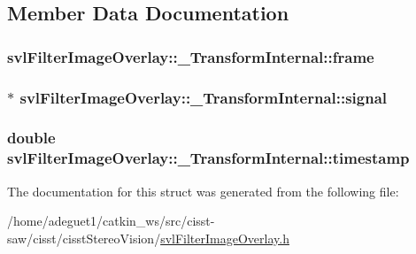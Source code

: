 \subsection{Member Data Documentation}
\hypertarget{structsvl_filter_image_overlay_1_1___transform_internal_a787852544228904e7cd3dfe152e0c8b5}{
\subsubsection[{frame}]{ svl\-Filter\-Image\-Overlay\-::\-\_\-\-Transform\-Internal\-::frame}}\label{structsvl_filter_image_overlay_1_1___transform_internal_a787852544228904e7cd3dfe152e0c8b5}
\hypertarget{structsvl_filter_image_overlay_1_1___transform_internal_a572ad98ec052cca3dc92321d7669c4e6}{
\subsubsection[{signal}]{$\ast$ svl\-Filter\-Image\-Overlay\-::\-\_\-\-Transform\-Internal\-::signal}}\label{structsvl_filter_image_overlay_1_1___transform_internal_a572ad98ec052cca3dc92321d7669c4e6}
\hypertarget{structsvl_filter_image_overlay_1_1___transform_internal_ae2a07acc677c86f82241a0c8594818c4}{
\subsubsection[{timestamp}]{\setlength{\rightskip}{0pt plus 5cm}double svl\-Filter\-Image\-Overlay\-::\-\_\-\-Transform\-Internal\-::timestamp}}\label{structsvl_filter_image_overlay_1_1___transform_internal_ae2a07acc677c86f82241a0c8594818c4}


The documentation for this struct was generated from the following file\-:\begin{DoxyCompactItemize}
\item 
/home/adeguet1/catkin\-\_\-ws/src/cisst-\/saw/cisst/cisst\-Stereo\-Vision/\hyperlink{svl_filter_image_overlay_8h}{svl\-Filter\-Image\-Overlay.\-h}\end{DoxyCompactItemize}
